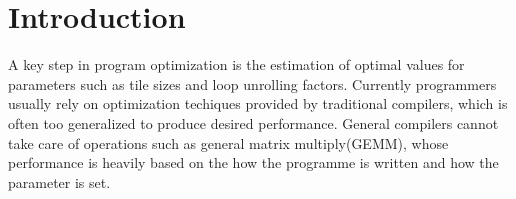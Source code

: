 \section{Introduction}
\label{sec:intro}

A key step in program optimization is the estimation of optimal values for
parameters such as tile sizes and loop unrolling factors. Currently programmers
usually rely on optimization techiques provided by traditional compilers, which
is often too generalized to produce desired performance. General compilers
cannot take care of operations such as general matrix multiply(GEMM), whose
performance is heavily based on the how the programme is written and how the
parameter is set.
